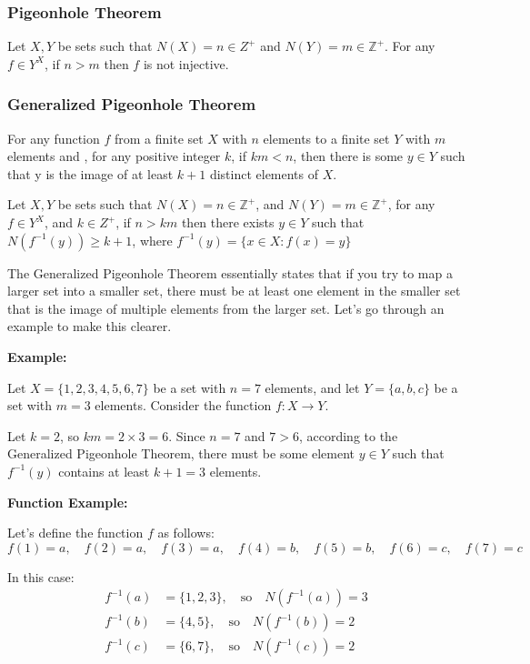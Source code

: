 \documentclass[12pt]{book}
\newcommand{\Z}{\mathbb{Z}}
\newcommand{\paren}[1]{\left( #1 \right)}
\begin{document}
\subsubsection{Pigeonhole Theorem} 
Let $X,Y$ be sets such that $N(X) = n \in Z^+$ and $N(Y) = m \in \Z^+$. For any $f \in Y^X$, if $n >m$ then $f$ is not injective. 

\subsubsection{Generalized Pigeonhole Theorem}
For any function $f$ from a finite set $X$ with $n$ elements to a finite set $Y$ with $m$ elements and , for any positive integer $k$, if $km <n$, then there is some $y\in Y$ such that y is the image of at least $k+1$ distinct elements of $X$.

Let $X,Y$ be sets such that $N(X) = n \in \Z^+$, and $N(Y) = m \in \Z^+$, for any $f \in Y^X$, and $k \in Z^+$, if $n >km$ then there exists $y \in Y$ such that $N\paren{f^{-1}(y)} \geq k+1$, where $f^{-1}(y) = \{ x\in X \colon f(x) = y\}$

The Generalized Pigeonhole Theorem essentially states that if you try to map a larger set into a smaller set, there must be at least one element in the smaller set that is the image of multiple elements from the larger set. Let's go through an example to make this clearer.

\textbf{Example:}

Let \( X = \{1, 2, 3, 4, 5, 6, 7\} \) be a set with \( n = 7 \) elements, and let \( Y = \{a, b, c\} \) be a set with \( m = 3 \) elements. Consider the function \( f: X \rightarrow Y \).

Let \( k = 2 \), so \( km = 2 \times 3 = 6 \). Since \( n = 7 \) and \( 7 > 6 \), according to the Generalized Pigeonhole Theorem, there must be some element \( y \in Y \) such that \( f^{-1}(y) \) contains at least \( k + 1 = 3 \) elements.

\textbf{Function Example:}

Let's define the function \( f \) as follows:
\[
f(1) = a, \quad f(2) = a, \quad f(3) = a, \quad f(4) = b, \quad f(5) = b, \quad f(6) = c, \quad f(7) = c
\]

In this case:
\begin{align*}
f^{-1}(a) &= \{1, 2, 3\}, \quad \text{so} \quad N(f^{-1}(a)) = 3 \\
f^{-1}(b) &= \{4, 5\}, \quad \text{so} \quad N(f^{-1}(b)) = 2 \\
f^{-1}(c) &= \{6, 7\}, \quad \text{so} \quad N(f^{-1}(c)) = 2
\end{align*}
\end{document}
